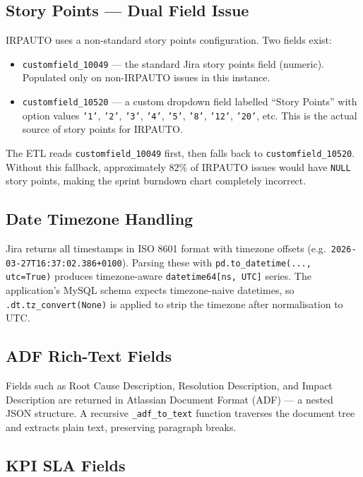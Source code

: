\documentclass[12pt, a4paper]{article}
\begin{document}
\subsection{Story Points — Dual Field Issue}

IRPAUTO uses a non-standard story points configuration. Two fields exist:

\begin{itemize}
    \item \texttt{customfield\_10049} — the standard Jira story points field (numeric).
          Populated only on non-IRPAUTO issues in this instance.
    \item \texttt{customfield\_10520} — a custom dropdown field labelled ``Story Points''
          with option values \texttt{'1'}, \texttt{'2'}, \texttt{'3'}, \texttt{'4'},
          \texttt{'5'}, \texttt{'8'}, \texttt{'12'}, \texttt{'20'}, etc. This is the
          actual source of story points for IRPAUTO.
\end{itemize}

The ETL reads \texttt{customfield\_10049} first, then falls back to
\texttt{customfield\_10520}. Without this fallback, approximately 82\% of IRPAUTO issues
would have \texttt{NULL} story points, making the sprint burndown chart completely incorrect.

\subsection{Date Timezone Handling}

Jira returns all timestamps in ISO 8601 format with timezone offsets
(e.g.\ \texttt{2026-03-27T16:37:02.386+0100}). Parsing these with
\texttt{pd.to\_datetime(..., utc=True)} produces timezone-aware \texttt{datetime64[ns, UTC]}
series. The application's MySQL schema expects timezone-naive datetimes, so
\texttt{.dt.tz\_convert(None)} is applied to strip the timezone after normalisation to UTC.

\subsection{ADF Rich-Text Fields}

Fields such as Root Cause Description, Resolution Description, and Impact Description are
returned in Atlassian Document Format (ADF) — a nested JSON structure. A recursive
\texttt{\_adf\_to\_text} function traverses the document tree and extracts plain text,
preserving paragraph breaks.

\subsection{KPI SLA Fields}
\end{document}
